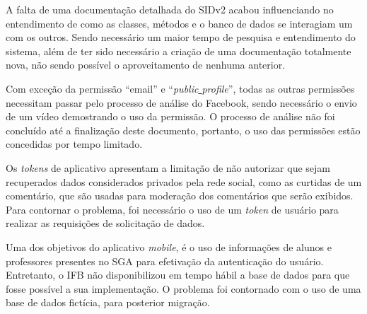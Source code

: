 A falta de uma documentação detalhada do SIDv2 acabou influenciando no entendimento de como as classes, métodos e o banco de dados se interagiam um com os outros. Sendo necessário um maior tempo de pesquisa e entendimento do sistema, além de ter sido necessário a criação de uma documentação totalmente nova, não sendo possível o aproveitamento de nenhuma anterior.

Com exceção da permissão ``email'' e ``\textit{public\underline{{ }}profile}'', todas as outras permissões necessitam passar pelo processo de análise do Facebook, sendo necessário o envio de um vídeo demostrando o uso da permissão. O processo de análise não foi concluído até a finalização deste documento, portanto, o uso das permissões estão concedidas por tempo limitado.

Os \textit{tokens} de aplicativo apresentam a limitação de não autorizar que sejam recuperados dados considerados privados pela rede social, como as curtidas de um comentário, que são usadas para moderação dos comentários que serão exibidos. Para contornar o problema, foi necessário o uso de um \textit{token} de usuário para realizar as requisições de solicitação de dados.

Uma dos objetivos do aplicativo \textit{mobile}, é o uso de informações de alunos e professores presentes no SGA para efetivação da autenticação do usuário. Entretanto, o IFB não disponibilizou em tempo hábil a base de dados para que fosse possível a sua implementação. O problema foi contornado com o uso de uma base de dados fictícia, para posterior migração. 